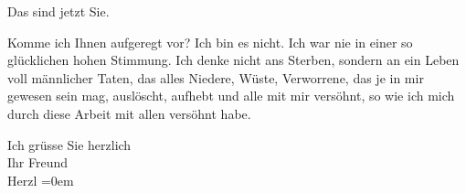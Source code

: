 \pstart
           Das sind jetzt Sie.\pend
           
\pstart
           Komme ich Ihnen aufgeregt vor? Ich bin es nicht. Ich war nie in einer so glücklichen
               hohen Stimmung. Ich denke nicht ans Sterben, sondern an ein Leben voll männlicher
               Taten, das alles Niedere, Wüste, Verworrene, das je in mir gewesen sein mag,
               auslöscht, aufhebt und alle mit mir versöhnt, so wie ich mich durch diese Arbeit mit
               allen versöhnt habe.\pend
           
\pstart
           Ich grüsse Sie herzlich{\\[\baselineskip]} Ihr Freund{\\[\baselineskip]}\spacefill\mbox{Herzl}\pend
           \leftskip=0em{}\endnumbering{}
\begin{anhang}
\end{anhang}\newcommand{\dateiname}{L03896}\newcommand{\titel}{Theodor Herzl an Arthur Schnitzler, 23. 6. 1895}\newcommand{\editorInnen}{Selma Jahnke und Martin Anton Müller}
